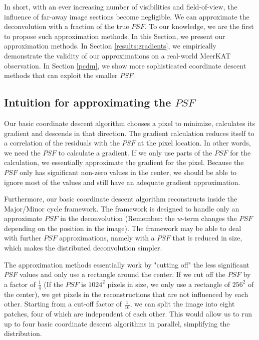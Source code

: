In short, with an ever increasing number of visibilities and field-of-view, the influence of far-away image sections become negligible. We can approximate the deconvolution with a fraction of the true $PSF$. To our knowledge, we are the first to propose such approximation methods. In this Section, we present our approximation methods. In Section \ref{results:gradients}, we empirically demonstrate the validity of our approximations on a real-world MeerKAT observation. In Section \ref{pcdm}, we show more sophisticated coordinate descent methods that can exploit the smaller $PSF$. 

\subsection{Intuition for approximating the $PSF$}
Our basic coordinate descent algorithm chooses a pixel to minimize, calculates its gradient and descends in that direction. The gradient calculation reduces itself to a correlation of the residuals with the $PSF$ at the pixel location. In other words, we need the $PSF$ to calculate a gradient. If we only use parts of the $PSF$ for the calculation, we essentially approximate the gradient for the pixel. Because the $PSF$ only has significant non-zero values in the center, we should be able to ignore most of the values and still have an adequate gradient approximation.


Furthermore, our basic coordinate descent algorithm reconstructs inside the Major/Minor cycle framework. The framework is designed to handle only an approximate $PSF$ in the deconvolution (Remember: the $w$-term changes the $PSF$ depending on the position in the image). The framework may be able to deal with further $PSF$ approximations, namely with a $PSF$ that is reduced in size, which makes the distributed deconvolution simpler.

The approximation methods essentially work by "cutting off" the less significant $PSF$ values and only use a rectangle around the center. If we cut off the $PSF$ by a factor of $\frac{1}{4}$ (If the $PSF$ is $1024^2$ pixels in size, we only use a rectangle of $256^2$ of the center), we get pixels in the reconstructions that are not influenced by each other. Starting from a cut-off factor of $\frac{1}{16}$, we can split the image into eight patches, four of which are independent of each other. This would allow us to run up to four basic coordinate descent algorithms in parallel, simplifying the distribution.

